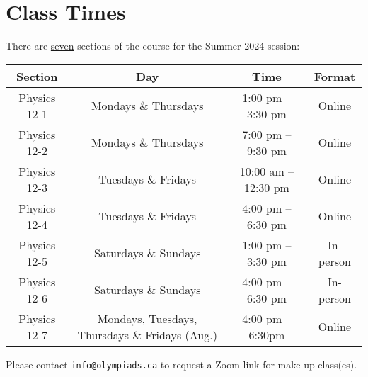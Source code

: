 \documentclass{../oss-handout}
\begin{document}
\section{Class Times}
There are \underline{seven} sections of the course for the Summer 2024 session:
\begin{center}
  \bgroup
  \def\arraystretch{1.1}
  \begin{tabular}{|c|c|c|c|}
    \hline
    \rowcolor{lightgray}
    \textbf{Section} & \textbf{Day} & \textbf{Time} & \textbf{Format}\\
    \hline\hline
    Physics 12-1 & Mondays \& Thursdays & 1:00 pm -- 3:30 pm & Online \\
    \hline
    Physics 12-2 & Mondays \& Thursdays & 7:00 pm -- 9:30 pm & Online \\
    \hline
    Physics 12-3 & Tuesdays \& Fridays & 10:00 am -- 12:30 pm & Online\\
    \hline
    Physics 12-4 & Tuesdays \& Fridays & 4:00 pm -- 6:30 pm & Online\\
    \hline
    Physics 12-5 & Saturdays \& Sundays & 1:00 pm -- 3:30 pm & In-person\\
    \hline
    Physics 12-6 & Saturdays \& Sundays & 4:00 pm -- 6:30 pm & In-person\\
    \hline
    Physics 12-7 & Mondays, Tuesdays, Thursdays \& Fridays (Aug.)
    & 4:00 pm -- 6:30pm & Online\\
    \hline                
  \end{tabular}
  \egroup
\end{center}
\vspace{-.1in}Please contact \texttt{info@olympiads.ca} to request a Zoom link
for make-up class(es).
\end{document}
